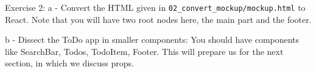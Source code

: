 \documentclass[presentation]{beamer}
\begin{document}
\begin{frame}[fragile,label=sec-19]{Exercise 2:}
 a - Convert the HTML given in \texttt{02\_convert\_mockup/mockup.html} to React. Note
that you will have two root nodes here, the main part and the footer.

b - Dissect the ToDo app in smaller components: You should have components
like SearchBar, Todos, TodoItem, Footer. This will prepare us for the next
section, in which we discuss props.
\end{frame}
\end{document}
